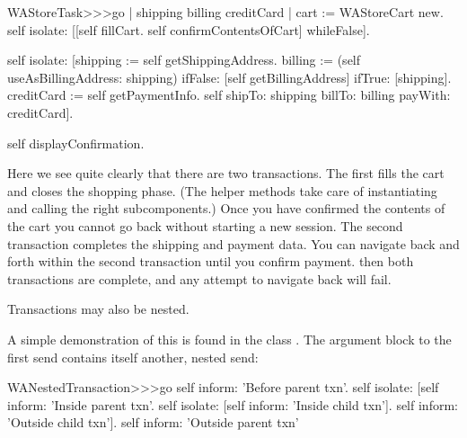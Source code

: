 \documentclass[a4paper,10pt,twoside]{book}
\begin{document}
\begin{code}{}
WAStoreTask>>>go
	| shipping billing creditCard |
	cart := WAStoreCart new.
	self isolate:
		[[self fillCart.
		self confirmContentsOfCart]
			whileFalse].

	self isolate:
		[shipping := self getShippingAddress.
		billing := (self useAsBillingAddress: shipping)
					ifFalse: [self getBillingAddress]
					ifTrue: [shipping].
		creditCard := self getPaymentInfo.
		self shipTo: shipping billTo: billing payWith: creditCard].

	self displayConfirmation.
\end{code}

Here we see quite clearly that there are two transactions.
The first fills the cart and closes the shopping phase.
(The helper methods  \etc take care of instantiating and calling the right subcomponents.)
Once you have confirmed the contents of the cart you cannot go back without starting a new session.
The second transaction completes the shipping and payment data.
You can navigate back and forth within the second transaction until you confirm payment.
then both transactions are complete, and any attempt to navigate back will fail.

Transactions may also be nested.

A simple demonstration of this is found in the class .
The argument block to the first  send contains itself another, nested  send:

\begin{code}{}
WANestedTransaction>>>go
	self inform: 'Before parent txn'.
	self isolate:
			[self inform: 'Inside parent txn'.
			self isolate: [self inform: 'Inside child txn'].
			self inform: 'Outside child txn'].
	self inform: 'Outside parent txn'
\end{code}

\end{document}
